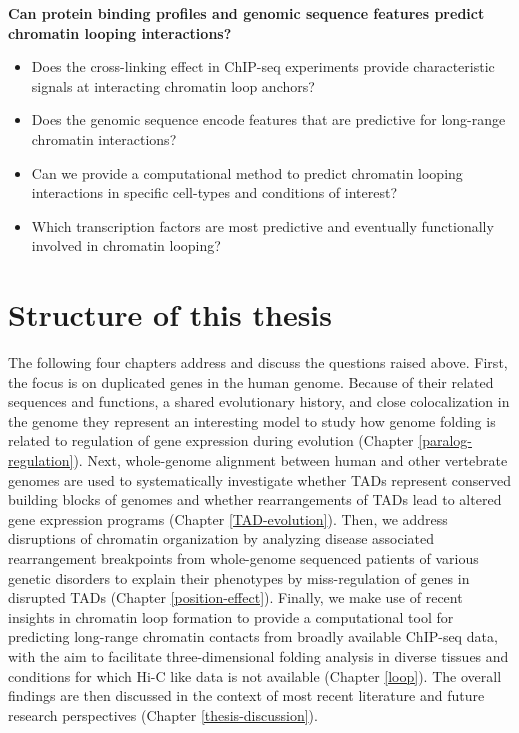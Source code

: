 \documentclass[a4paper,twoside=true,openright,parskip=full,chapterprefix=true,11pt,headings=normal,bibliography=totoc,listof=totoc,titlepage=on,captions=tableabove,draft=false]{scrreprt}
\providecommand{\tightlist}{%
  \setlength{\itemsep}{0pt}\setlength{\parskip}{0pt}}
\theoremstyle{definition}
\theoremstyle{definition}
\theoremstyle{definition}
\theoremstyle{remark}
\begin{document}
\textbf{Can protein binding profiles and genomic sequence features
predict chromatin looping interactions?}

\begin{itemize}
\tightlist
\item
  Does the cross-linking effect in ChIP-seq experiments provide
  characteristic signals at interacting chromatin loop anchors?
\item
  Does the genomic sequence encode features that are predictive for
  long-range chromatin interactions?
\item
  Can we provide a computational method to predict chromatin looping
  interactions in specific cell-types and conditions of interest?
\item
  Which transcription factors are most predictive and eventually
  functionally involved in chromatin looping?
\end{itemize}

\hypertarget{structure-of-this-thesis}{%
\section{Structure of this thesis}\label{structure-of-this-thesis}}

The following four chapters address and discuss the questions raised
above. First, the focus is on duplicated genes in the human genome.
Because of their related sequences and functions, a shared evolutionary
history, and close colocalization in the genome they represent an
interesting model to study how genome folding is related to regulation
of gene expression during evolution (Chapter \ref{paralog-regulation}).
Next, whole-genome alignment between human and other vertebrate genomes
are used to systematically investigate whether TADs represent conserved
building blocks of genomes and whether rearrangements of TADs lead to
altered gene expression programs (Chapter \ref{TAD-evolution}). Then, we
address disruptions of chromatin organization by analyzing disease
associated rearrangement breakpoints from whole-genome sequenced
patients of various genetic disorders to explain their phenotypes by
miss-regulation of genes in disrupted TADs (Chapter
\ref{position-effect}). Finally, we make use of recent insights in
chromatin loop formation to provide a computational tool for predicting
long-range chromatin contacts from broadly available ChIP-seq data, with
the aim to facilitate three-dimensional folding analysis in diverse
tissues and conditions for which Hi-C like data is not available
(Chapter \ref{loop}). The overall findings are then discussed in the
context of most recent literature and future research perspectives
(Chapter \ref{thesis-discussion}).
\end{document}

